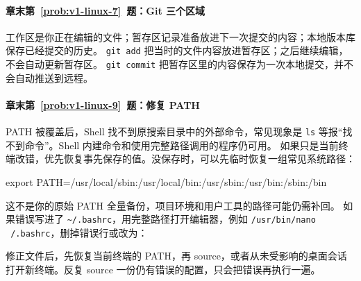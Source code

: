 \paragraph*{章末第~\ref{prob:v1-linux-7}~题：Git 三个区域}
\begin{solution}
工作区是你正在编辑的文件；暂存区记录准备放进下一次提交的内容；本地版本库保存已经提交的历史。
\texttt{git add} 把当时的文件内容放进暂存区；之后继续编辑，不会自动更新暂存区。
\texttt{git commit} 把暂存区里的内容保存为一次本地提交，并不会自动推送到远程。
\end{solution}

\paragraph*{章末第~\ref{prob:v1-linux-9}~题：修复 PATH}
\begin{solution}
PATH 被覆盖后，Shell 找不到原搜索目录中的外部命令，常见现象是 \texttt{ls} 等报“找不到命令”。Shell 内建命令和使用完整路径调用的程序仍可用。
如果只是当前终端改错，优先恢复事先保存的值。没保存时，可以先临时恢复一组常见系统路径：

\begin{tbash}
export PATH=/usr/local/sbin:/usr/local/bin:/usr/sbin:/usr/bin:/sbin:/bin
\end{tbash}

这不是你的原始 PATH 全量备份，项目环境和用户工具的路径可能仍需补回。
如果错误写进了 \texttt{\textasciitilde/.bashrc}，用完整路径打开编辑器，例如 \texttt{/usr/bin/nano ~/.bashrc}，删掉错误行或改为：


修正文件后，先恢复当前终端的 PATH，再 source，或者从未受影响的桌面会话打开新终端。反复 source 一份仍有错误的配置，只会把错误再执行一遍。
\end{solution}

